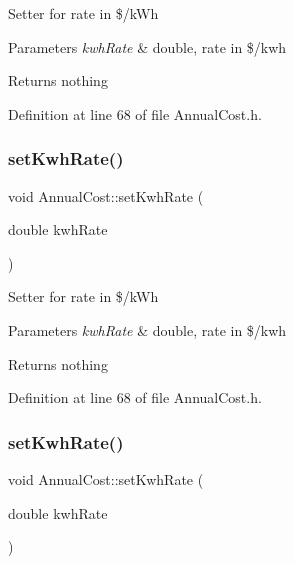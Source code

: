 Setter for rate in \$/k\+Wh 
\begin{DoxyParams}{Parameters}
{\em kwh\+Rate} & double, rate in \$/kwh \\
\hline
\end{DoxyParams}
\begin{DoxyReturn}{Returns}
nothing 
\end{DoxyReturn}


Definition at line 68 of file Annual\+Cost.\+h.

\mbox{\label{class_annual_cost_a45a1259c9912c7202dff446c290210e9}} 
\subsubsection{\texorpdfstring{set\+Kwh\+Rate()}{setKwhRate()}\hspace{0.1cm}{\footnotesize\ttfamily [2/3]}}
{\footnotesize\ttfamily void Annual\+Cost\+::set\+Kwh\+Rate (\begin{DoxyParamCaption}\item[{double}]{kwh\+Rate }\end{DoxyParamCaption})\hspace{0.3cm}{\ttfamily [inline]}}

Setter for rate in \$/k\+Wh 
\begin{DoxyParams}{Parameters}
{\em kwh\+Rate} & double, rate in \$/kwh \\
\hline
\end{DoxyParams}
\begin{DoxyReturn}{Returns}
nothing 
\end{DoxyReturn}


Definition at line 68 of file Annual\+Cost.\+h.

\mbox{\label{class_annual_cost_a45a1259c9912c7202dff446c290210e9}} 
\subsubsection{\texorpdfstring{set\+Kwh\+Rate()}{setKwhRate()}\hspace{0.1cm}{\footnotesize\ttfamily [3/3]}}
{\footnotesize\ttfamily void Annual\+Cost\+::set\+Kwh\+Rate (\begin{DoxyParamCaption}\item[{double}]{kwh\+Rate }\end{DoxyParamCaption})\hspace{0.3cm}{\ttfamily [inline]}}

